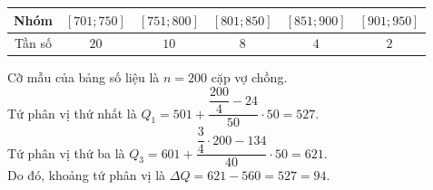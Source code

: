 \begin{ex}
{\begin{center}
\begin{tabular}{|c|c|c|c|c|c|}
				\hline Nhóm  & $[701 ; 750]$ &$[751 ; 800]$&$[801 ; 850]$& $[851 ; 900]$ & $[901 ; 950]$ \\
				\hline Tần số & $20$ &$10$& $8$ & $4$ & $2$ \\
				\hline
			\end{tabular}
		\end{center}
		Cỡ mẫu của bảng số liệu là $n=200$ cặp vợ chồng.\\
		Tứ phân vị thứ nhất là $Q_1=501+\dfrac{\dfrac{200}{4}-24}{50}\cdot 50=527$.\\
		Tứ phân vị thứ ba là $Q_3=601+\dfrac{\dfrac{3}{4}\cdot 200-134}{40}\cdot 50=621$.\\
		Do đó, khoảng tứ phân vị là $\Delta Q=621 - 560 = 527 = 94$.
		
	}
\end{ex}

